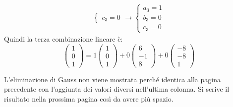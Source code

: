 \documentclass[a4paper]{article}
\begin{document}
\begin{itemize}
\begin{equation*}
\begin{array}{l}
\begin{cases}
					c_{3} = 0
				\end{cases} \rightarrow
				\begin{cases}
					a_{3} = 1 \\
					b_{3} = 0 \\
					c_{3} = 0
				\end{cases}
			\end{array}
		\end{equation*}
		Quindi la terza combinazione lineare è:
		\begin{equation*}
			\begin{pmatrix}
				1 \\ 0 \\ 1
			\end{pmatrix} =
			1 \begin{pmatrix}
				1 \\ 0 \\ 1
			\end{pmatrix} +
			0 \begin{pmatrix}
				6 \\ -1 \\ 8
			\end{pmatrix} +
			0 \begin{pmatrix}
				-8 \\ -8 \\ 1
			\end{pmatrix}
		\end{equation*}
	\end{itemize}
	L'eliminazione di Gauss non viene mostrata perché identica alla pagina precedente con l'aggiunta dei valori diversi nell'ultima colonna. Si scrive il risultato nella prossima pagina così da avere più spazio.\newpage
	
\end{document}
